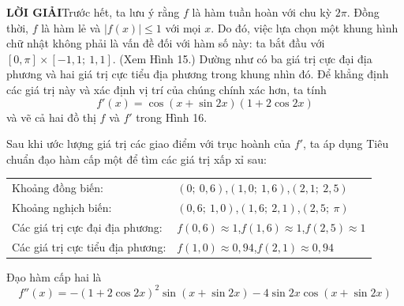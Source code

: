 \documentclass[10pt,a4paper]{article}
\begin{document}
\begin{minipage}[t]{0.71\textwidth}
  \vspace{4pt}
  \noindent
  \textbf{\textsf{\color{stewartcyan}LỜI GIẢI}}\hspace{0.8em}Trước hết, ta lưu ý rằng $f$ là hàm tuần hoàn với chu kỳ $2\pi$. Đồng thời, $f$ là hàm lẻ và $|f(x)| \leqslant 1$ với mọi $x$. Do đó, việc lựa chọn một khung hình chữ nhật không phải là vấn đề đối với hàm số này: ta bắt đầu với $[0, \pi] \times [-1{,}1;\ 1{,}1]$. (Xem Hình 15.) Dường như có ba giá trị cực đại địa phương và hai giá trị cực tiểu địa phương trong khung nhìn đó. Để khẳng định các giá trị này và xác định vị trí của chúng chính xác hơn, ta tính
  \[
    f'(x) = \cos(x + \sin 2x)(1 + 2\cos 2x)
  \]
  và vẽ cả hai đồ thị $f$ và $f'$ trong Hình 16.

  Sau khi ước lượng giá trị các giao điểm với trục hoành của $f'$, ta áp dụng Tiêu chuẩn đạo hàm cấp một để tìm các giá trị xấp xỉ sau:

  \vspace{2pt}
  \hspace*{1.2em}\begin{tabular}{@{}ll}
    Khoảng đồng biến: & $(0;\ 0{,}6)$,\quad $(1{,}0;\ 1{,}6)$,\quad $(2{,}1;\ 2{,}5)$ \\[3pt]
    Khoảng nghịch biến: & $(0{,}6;\ 1{,}0)$,\quad $(1{,}6;\ 2{,}1)$,\quad $(2{,}5;\ \pi)$ \\[3pt]
    Các giá trị cực đại địa phương: & $f(0{,}6) \approx 1$,\quad $f(1{,}6) \approx 1$,\quad $f(2{,}5) \approx 1$ \\[3pt]
    Các giá trị cực tiểu địa phương: & $f(1{,}0) \approx 0{,}94$,\quad $f(2{,}1) \approx 0{,}94$
  \end{tabular}

  \vspace{4pt}
  Đạo hàm cấp hai là
  \[
    f''(x) = -(1 + 2\cos 2x)^2 \sin(x + \sin 2x) - 4\sin 2x \cos(x + \sin 2x)
  \]
\end{minipage}
\end{document}
